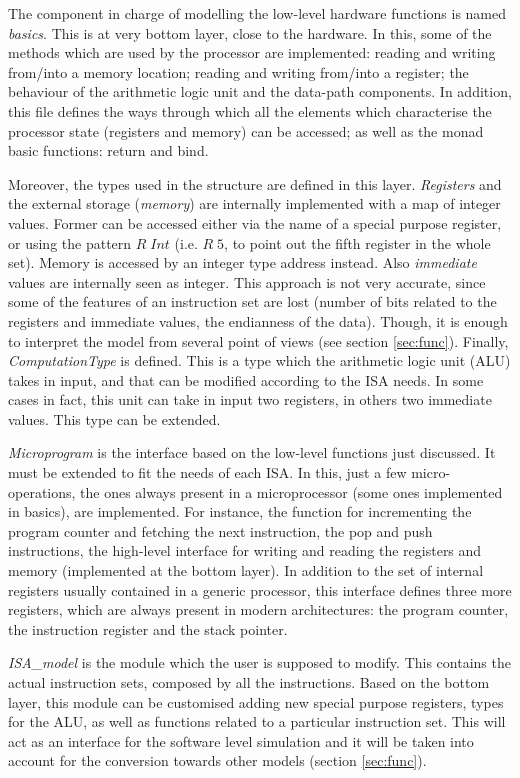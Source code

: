 \documentclass[conference]{IEEEtran}
\begin{document}
The component in charge of modelling the low-level hardware functions is named
\textit{basics}. This is at very bottom layer, close to the hardware.
In this, some of the methods which are used by the processor are implemented: 
reading and writing from/into a memory location; reading
and writing from/into a register; the behaviour of the arithmetic logic unit and the
data-path components. In addition, this file defines the ways through which all the 
elements which characterise the processor state (registers and memory) can be accessed;
as well as the monad basic functions: return and bind.

Moreover, the types used in the structure are defined in this layer.
\textit{Registers} and the external storage (\textit{memory}) are internally
implemented with a map of integer values. Former can be accessed either via the name of a
special purpose register, or using the pattern $R \; Int$ (i.e. $R \; 5$, to point out the
fifth register in the whole set). Memory is accessed by an integer type address instead.
Also \textit{immediate} values are internally seen as integer. This approach is not very
accurate, since some of the features of an instruction set are lost (number of bits
related to the registers and immediate values, the endianness of the data).
Though, it is enough to interpret the model from several point of views (see section
\ref{sec:func}). Finally, \textit{ComputationType} is defined. This is a type which the
arithmetic logic unit (ALU) takes in input, and that can be modified according to the ISA needs. In some cases in fact, this unit can take in input two registers, in others two
immediate values. This type can be extended.

\textit{Microprogram} is the interface based on the low-level functions just discussed.
It must be extended to fit the needs of each ISA. In this, just a few micro-operations,
the ones always present in a microprocessor (some ones implemented in basics), are
implemented. For instance, the function for incrementing the program counter and fetching
the next instruction, the pop and push instructions, the high-level interface for writing
and reading the registers and memory (implemented at the bottom layer).
In addition to the set of internal registers usually contained in a generic processor,
this interface defines three more registers, which are always present in modern
architectures: the program counter, the instruction register and the stack pointer.

\textit{ISA\_model} is the module which the user is supposed to modify. This contains the
actual instruction sets, composed by all the instructions. Based on the bottom layer, this
module can be customised adding new special purpose registers, types for the ALU, as well as
functions related to a particular instruction set. This will act as an interface for the
software level simulation and it will be taken into account for the conversion towards other
models (section \ref{sec:func}).
\end{document}

